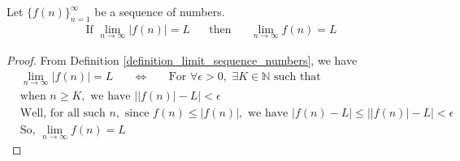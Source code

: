 \begin{theorem} 
Let $\{f(n)\}_{n = 1}^{\infty}$ be a sequence of numbers.
\begin{align*}
    \text{If} \hspace{4pt} \lim_{n \longrightarrow \infty} \lvert f(n) \rvert = L \hspace{20pt} \text{then} \hspace{20pt} \lim_{n \longrightarrow \infty} f(n) = L
\end{align*}
\begin{proof}
    From Definition \ref{definition_limit_sequence_numbers}, we have
    \begin{align*}
        &\lim_{n \longrightarrow \infty}\lvert f(n) \rvert = L \hspace{20pt} \Longleftrightarrow \hspace{20pt} \text{For} \hspace{4pt} \forall \epsilon>0, \hspace{4pt} \exists K \in \mathbb{N} \hspace{4pt} \text{such that} \\[2ex] 
        &\text{when} \hspace{4pt} n \geq K, \hspace{4pt} \text{we have} \hspace{4pt} \Big\lvert \lvert f(n) \rvert - L \Big\rvert < \epsilon \\[2ex]
        &\text{Well, for all such} \hspace{4pt} n, \hspace{4pt} \text{since} \hspace{4pt} f(n) \leq \lvert f(n) \rvert, \hspace{4pt} \text{we have} \hspace{4pt} \lvert f(n) - L \rvert \leq \Big\lvert \lvert f(n) \rvert - L \Big\rvert < \epsilon \\[2ex]
        &\text{So,} \hspace{4pt} \lim_{n \longrightarrow \infty} f(n) = L
    \end{align*}
\end{proof}
\end{theorem}



